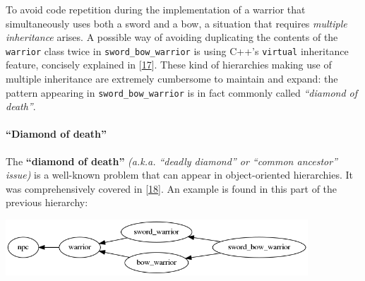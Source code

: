 \documentclass[twoside, 12pt, a4paper, openany]{book}
\let\origfigure=\figure
\let\endorigfigure=\endfigure
\renewenvironment{figure}[1][]{%
\origfigure[H]
}{%
\endorigfigure
}
\begin{document}
To avoid code repetition during the implementation of a warrior that
simultaneously uses both a sword and a bow, a situation that requires
\emph{multiple inheritance} arises. A possible way of avoiding
duplicating the contents of the
\texttt{warrior}
class twice in
\texttt{sword_bow_warrior}
is using C++'s
\texttt{virtual}
inheritance feature, concisely explained in
{[}\protect\hyperlink{ref-cppreference_virtual_base_classes}{17}{]}.
These kind of hierarchies making use of multiple inheritance are
extremely cumbersome to maintain and expand: the pattern appearing in
\texttt{sword_bow_warrior}
is in fact commonly called \emph{``diamond of death''}.

\paragraph{\texorpdfstring{``Diamond of
death''}{Diamond of death}}\label{diamond-of-death}

The \textbf{``diamond of death''} \emph{(a.k.a. ``deadly diamond'' or
``common ancestor'' issue)} is a well-known problem that can appear in
object-oriented hierarchies. It was comprehensively covered in
{[}\protect\hyperlink{ref-truyen2004generalization}{18}{]}. An example
is found in this part of the previous hierarchy:

\begin{figure}[htbp]
\centering
\includegraphics[width=0.85000\textwidth]{source/figures/generated/ecs/overview/oop/diamond_of_death.png}
\caption{OOP encoding issue: ``diamond of death''}
\end{figure}
\end{document}
